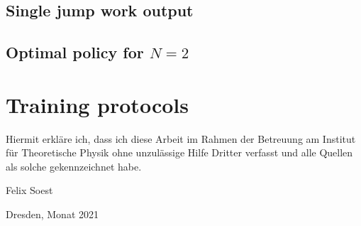 \section{Single jump work output}


\section{Optimal policy for $N=2$} \label{n2_opt_pol}

\chapter{Training protocols}








\clearpage
\thispagestyle{empty}
\vspace*{1.5em}

Hiermit erkläre ich, dass ich diese Arbeit im Rahmen der Betreuung am Institut
für Theoretische Physik ohne unzulässige Hilfe Dritter verfasst und alle Quellen als solche gekennzeichnet habe.

\vspace*{45em}

Felix Soest \par
Dresden, Monat 2021


